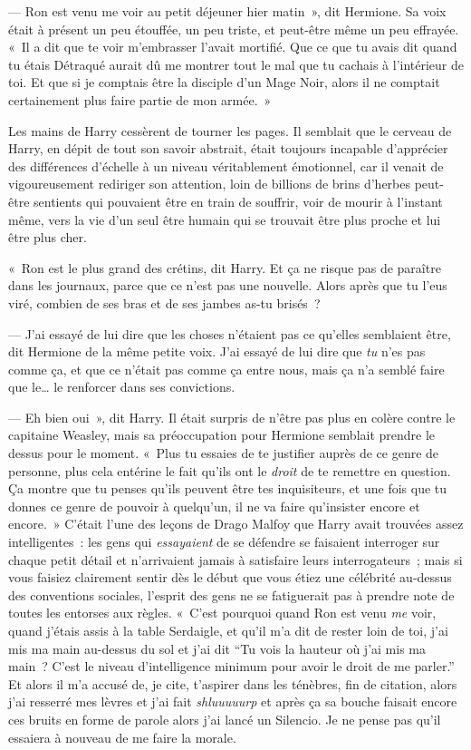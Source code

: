 --- Ron est venu me voir au petit déjeuner hier matin~», dit Hermione. Sa voix était à présent un peu étouffée, un peu triste, et peut-être même un peu effrayée. «~Il a dit que te voir m'embrasser l'avait mortifié. Que ce que tu avais dit quand tu étais Détraqué aurait dû me montrer tout le mal que tu cachais à l'intérieur de toi. Et que si je comptais être la disciple d'un Mage Noir, alors il ne comptait certainement plus faire partie de mon armée.~»

Les mains de Harry cessèrent de tourner les pages. Il semblait que le cerveau de Harry, en dépit de tout son savoir abstrait, était toujours incapable d'apprécier des différences d'échelle à un niveau véritablement émotionnel, car il venait de vigoureusement rediriger son attention, loin de billions de brins d'herbes peut-être sentients qui pouvaient être en train de souffrir, voir de mourir à l'instant même, vers la vie d'un seul être humain qui se trouvait être plus proche et lui être plus cher.

«~Ron est le plus grand des crétins, dit Harry. Et ça ne risque pas de paraître dans les journaux, parce que ce n'est pas une nouvelle. Alors après que tu l'eus viré, combien de ses bras et de ses jambes as-tu brisés~?

--- J'ai essayé de lui dire que les choses n'étaient pas ce qu'elles semblaient être, dit Hermione de la même petite voix. J'ai essayé de lui dire que \emph{tu} n'es pas comme ça, et que ce n'était pas comme ça entre nous, mais ça n'a semblé faire que le… le renforcer dans ses convictions.

--- Eh bien oui~», dit Harry. Il était surpris de n'être pas plus en colère contre le capitaine Weasley, mais sa préoccupation pour Hermione semblait prendre le dessus pour le moment. «~Plus tu essaies de te justifier auprès de ce genre de personne, plus cela entérine le fait qu'ils ont le \emph{droit} de te remettre en question. Ça montre que tu penses qu'ils peuvent être tes inquisiteurs, et une fois que tu donnes ce genre de pouvoir à quelqu'un, il ne va faire qu'insister encore et encore.~» C'était l'une des leçons de Drago Malfoy que Harry avait trouvées assez intelligentes~: les gens qui \emph{essayaient} de se défendre se faisaient interroger sur chaque petit détail et n'arrivaient jamais à satisfaire leurs interrogateurs~; mais si vous faisiez clairement sentir dès le début que vous étiez une célébrité au-dessus des conventions sociales, l'esprit des gens ne se fatiguerait pas à prendre note de toutes les entorses aux règles. «~C'est pourquoi quand Ron est venu \emph{me} voir, quand j'étais assis à la table Serdaigle, et qu'il m'a dit de rester loin de toi, j'ai mis ma main au-dessus du sol et j'ai dit “Tu vois la hauteur où j'ai mis ma main~? C'est le niveau d'intelligence minimum pour avoir le droit de me parler.” Et alors il m'a accusé de, je cite, t'aspirer dans les ténèbres, fin de citation, alors j'ai resserré mes lèvres et j'ai fait \emph{shluuuuurp} et après ça sa bouche faisait encore ces bruits en forme de parole alors j'ai lancé un Silencio. Je ne pense pas qu'il essaiera à nouveau de me faire la morale.

